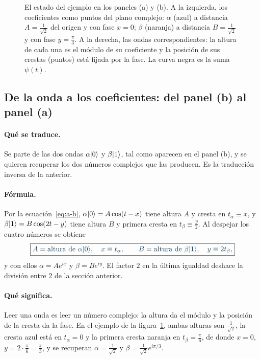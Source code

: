 \begin{figure}[H]
\caption{El estado del ejemplo en los paneles (a) y (b). A la izquierda, los coeficientes como
puntos del plano complejo: $\alpha$ (azul) a distancia $A=\frac1{\sqrt2}$ del origen y con fase
$x=0$; $\beta$ (naranja) a distancia $B=\frac1{\sqrt2}$ y con fase $y=\frac\pi3$. A la derecha,
las ondas correspondientes: la altura de cada una es el módulo de su coeficiente y la posición de
sus crestas (puntos) está fijada por la fase. La curva negra es la suma $\psi(t)$.}
\label{fig:a-b}
\end{figure}

\subsection*{De la onda a los coeficientes: del panel (b) al panel (a)}

\paragraph{Qué se traduce.}
Se parte de las dos ondas $\alpha\lvert 0\rangle$ y $\beta\lvert 1\rangle$, tal como aparecen en el panel (b), y se
quieren recuperar los dos números complejos que las producen. Es la traducción inversa de la
anterior.

\paragraph{Fórmula.}
Por la ecuación~\eqref{eq:a-b}, $\alpha\lvert 0\rangle=A\cos(t-x)$ tiene altura $A$ y cresta en
$t_\alpha\equiv x$, y $\beta\lvert 1\rangle=B\cos(2t-y)$ tiene altura $B$ y primera cresta en
$t_\beta\equiv\frac y2$. Al despejar los cuatro números se obtiene
\begin{equation}\label{eq:b-a}
  \destacado{A=\text{altura de }\alpha\ket0,\quad x\equiv t_\alpha,\qquad
  B=\text{altura de }\beta\ket1,\quad y\equiv 2t_\beta ,}
\end{equation}
y con ellos $\alpha=Ae^{ix}$ y $\beta=Be^{iy}$. El factor $2$ en la última igualdad deshace la
división entre $2$ de la sección anterior.

\paragraph{Qué significa.}
Leer una onda es leer un número complejo: la altura da el módulo y la posición de la cresta da
la fase. En el ejemplo de la figura~\ref{fig:a-b}, ambas alturas son $\frac1{\sqrt2}$, la cresta
azul está en $t_\alpha=0$ y la primera cresta naranja en $t_\beta=\frac\pi6$, de donde $x=0$,
$y=2\cdot\frac\pi6=\frac\pi3$, y se recuperan $\alpha=\frac1{\sqrt2}$ y
$\beta=\frac1{\sqrt2}e^{i\pi/3}$.

